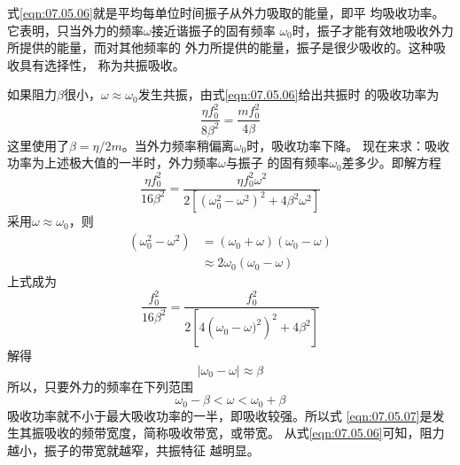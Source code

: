 式\eqref{eqn:07.05.06}就是平均每单位时间振子从外力吸取的能量，即平
均吸收功率。它表明，只当外力的频率$ \omega $接近谐振子的固有频率
$ \omega_{ 0 } $时，振子才能有效地吸收外力所提供的能量，而对其他频率的
外力所提供的能量，振子是很少吸收的。这种吸收具有选择性，
称为共振吸收。

如果阻力$ \beta $很小，$ \omega \approx \omega _ { 0 } $发生共振，由式\eqref{eqn:07.05.06}给出共振时
的吸收功率为\vspace{-0.5em}
\begin{equation*}
  \frac { \eta f _ { 0 } ^ { 2 } } { 8 \beta ^ { 2 } } = \frac { m f _ { 0 } ^ { 2 } } { 4 \beta }
\end{equation*}
这里使用了$ \beta = \eta / 2 m $。当外力频率稍偏离$\omega_{ 0 }$时，吸收功率下降。
现在来求：吸收功率为上述极大值的一半时，外力频率$ \omega $与振子
的固有频率$ \omega_{ 0 } $差多少。即解方程\vspace{-0.2em}
\begin{equation*}
  \frac { \eta f _ { 0 } ^ { 2 } } { 16 \beta ^ { 2 } }  = \frac { \eta f _ { 0 } ^ { 2 } \omega ^ { 2 } } { 2 \left[ \left( \omega_{ 0 } ^ { 2 } - \omega ^ { 2 } \right) ^ { 2 } + 4 \beta ^ { 2 } \omega ^ { 2 } \right] }
\end{equation*}\vspace{-0.3em}
采用$ \omega \approx \omega _ { 0 } $，则
\vspace{-0.5em}
\begin{equation*}
  \begin{aligned}
    \left( \omega _ { 0 } ^ { 2 } - \omega ^ { 2 } \right) & = \left( \omega _ { 0 } + \omega \right) \left( \omega _ { 0 } - \omega \right) \\
                                                           & \approx 2 \omega _ { 0 } \left( \omega _ { 0 } - \omega \right)
  \end{aligned}
\end{equation*}
上式成为\vspace{-1.56em}
\begin{equation*}
  \frac { f _ { 0 } ^ { 2 } } { 16 \beta ^ { 2 } }  = \frac { f _ { 0 } ^ { 2 } } { 2 \left[ 4 \left( \omega_{ 0 } - \omega ) ^ { 2 } \right) ^ { 2 } + 4 \beta ^ { 2 } \right] }
\end{equation*}
解得\vspace{-1.56em}
\begin{equation*}
  \left| \omega _ { 0 } - \omega \right| \approx \beta
\end{equation*}
所以，只要外力的频率在下列范围
\begin{equation}\label{eqn:07.05.07}
  \omega _ { 0 } - \beta < \omega < \omega _ { 0 } + \beta
\end{equation}
吸收功率就不小于最大吸收功率的一半，即吸收较强。所以式
\eqref{eqn:07.05.07}是发生其振吸收的频带宽度，简称吸收带宽，或带宽。
从式\eqref{eqn:07.05.06}可知，阻力越小，振子的带宽就越窄，共振特征
越明显。